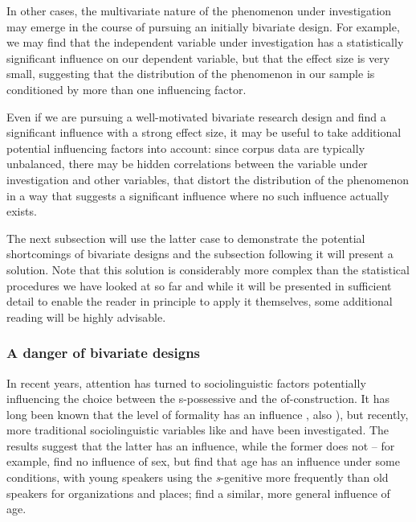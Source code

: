 In other cases, the multivariate nature of the phenomenon under investigation may emerge in the course of pursuing an initially bivariate design. For example, we may find that the independent variable under investigation has a statistically significant influence on our dependent variable, but that the effect size is very small, suggesting that the distribution of the phenomenon in our sample is conditioned by more than one influencing factor.

Even if we are pursuing a well-motivated bivariate research design and find a significant influence with a strong effect size, it may be useful to take additional potential influencing factors into account: since corpus data are typically unbalanced, there may be hidden correlations between the variable under investigation and other variables, that distort the distribution of the phenomenon in a way that suggests a significant influence where no such influence actually exists.

The next subsection will use the latter case to demonstrate the potential shortcomings of bivariate designs and the subsection following it will present a solution. Note that this solution is considerably more complex than the statistical procedures we have looked at so far and while it will be presented in sufficient detail to enable the reader in principle to apply it themselves, some additional reading will be highly advisable.

\subsubsection{A danger of bivariate designs}

In recent years, attention has turned to sociolinguistic factors potentially influencing the choice between the {s}-possessive and the {of}-construction. It has long been known that the level of formality has an influence \citep{jucker_genitive_1993}, also \citet{grafmiller_variation_2014}), but recently, more traditional sociolinguistic variables like  and  have been investigated. The results suggest that the latter has an influence, while the former does not -- for example, \citet{jankowski_genitives_2014} find no influence of sex, but find that age has an influence under some conditions, with young speakers using the \textit{s}-genitive more frequently than old speakers for organizations and places; \citet{vogel_rhythms_2015} find a similar, more general influence of age.

